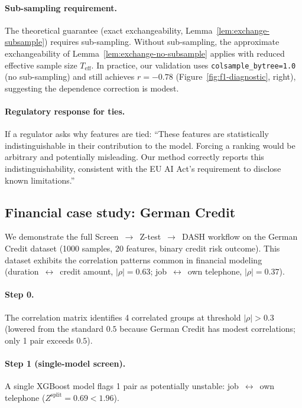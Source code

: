 \documentclass{article}
\begin{document}
\paragraph{Sub-sampling requirement.}
The theoretical guarantee (exact exchangeability,
Lemma~\ref{lem:exchange-subsample}) requires sub-sampling.
Without sub-sampling, the approximate exchangeability of
Lemma~\ref{lem:exchange-no-subsample} applies with reduced effective
sample size $T_{\text{eff}}$.
In practice, our validation uses \texttt{colsample\_bytree=1.0}
(no sub-sampling) and still achieves $r = -0.78$
(Figure~\ref{fig:f1-diagnostic}, right), suggesting the dependence
correction is modest.

\paragraph{Regulatory response for ties.}
If a regulator asks why features are tied: ``These features are
statistically indistinguishable in their contribution to the model.
Forcing a ranking would be arbitrary and potentially misleading.
Our method correctly reports this indistinguishability, consistent
with the EU AI Act's requirement to disclose known limitations.''

\subsection{Financial case study: German Credit}

We demonstrate the full Screen~$\to$~Z-test~$\to$~DASH workflow on the
German Credit dataset (1000 samples, 20 features, binary credit
risk outcome). This dataset exhibits the correlation patterns common
in financial modeling (duration~$\leftrightarrow$~credit amount,
$|\rho| = 0.63$; job~$\leftrightarrow$~own telephone, $|\rho| = 0.37$).

\paragraph{Step 0.} The correlation matrix identifies 4 correlated groups
at threshold $|\rho| > 0.3$ (lowered from the standard $0.5$ because
German Credit has modest correlations; only 1 pair exceeds $0.5$).

\paragraph{Step 1 (single-model screen).} A single XGBoost model flags 1 pair as
potentially unstable: job~$\leftrightarrow$~own telephone
($Z^{\text{split}} = 0.69 < 1.96$).
\end{document}
